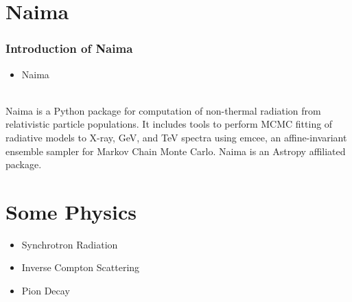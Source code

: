 \documentclass[9pt, mathserif]{beamer}
\begin{document}
    \section{Naima}
        \begin{frame}
            \frametitle{Introduction of Naima}
            \begin{itemize}
                \item \huge{Naima}
            \end{itemize}
            
            \phantom{0}\\

            Naima is a Python package for computation of non-thermal radiation from relativistic particle populations. It includes tools to perform MCMC fitting of radiative models to X-ray, GeV, and TeV spectra using emcee, an affine-invariant ensemble sampler for Markov Chain Monte Carlo. Naima is an Astropy affiliated package.
        \end{frame}

    \section{Some Physics}
        \begin{frame}
            \huge{
            \begin{itemize}
                \item Synchrotron Radiation
                \item Inverse Compton Scattering
                \item Pion Decay
            \end{itemize}}
        \end{frame}
\end{document}
